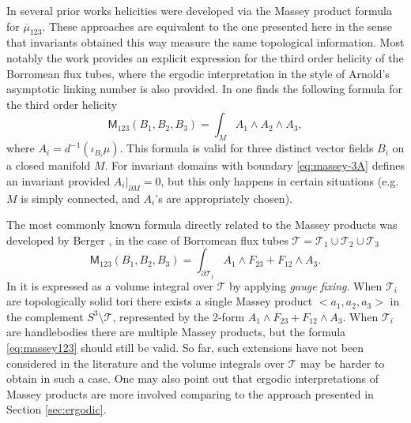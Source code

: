 \documentclass[12pt]{article}
\numberwithin{equation}{section}
\newcommand{\no}{\noindent}
\begin{document}
In several prior works \cite{Berger90, Berger-Evans92, Laurence-Stredulinsky00b, Mayer03} helicities were developed via the Massey product formula for $\bar{\mu}_{123}$. These approaches are equivalent to the one presented here in the sense that invariants obtained this way measure the same topological information. Most notably the work \cite{Laurence-Stredulinsky00b} provides an explicit expression for the third order helicity of the Borromean flux tubes, where the ergodic interpretation in the style of Arnold's asymptotic linking number is also provided.  In  \cite{Mayer03} one finds the following formula for the third order helicity
\begin{equation}\label{eq:massey-3A}
 \mathsf{M}_{123}(B_1,B_2,B_3)=\int_M A_1\wedge A_2\wedge A_3,
\end{equation}
where $A_i=d^{-1}(\iota_{B_i}\mu)$. This formula is valid for three distinct vector fields $B_i$
on a closed manifold $M$. For invariant domains with boundary 
\eqref{eq:massey-3A} defines an invariant provided $A_i\bigl|_{\partial M}=0$, but this only happens in certain situations (e.g. $M$ is simply connected, and $A_i$'s are appropriately chosen). 

\no The most commonly known formula directly related to the Massey products was developed by Berger \cite{Berger90}, in the case of 
Borromean flux tubes $\mathcal{T}=\mathcal{T}_1\cup \mathcal{T}_2\cup \mathcal{T}_3$
\begin{equation}\label{eq:massey123}
 \mathsf{M}_{123}(B_1,B_2,B_3)=\int_{\partial \mathcal{T}_1} A_1\wedge F_{23}+F_{12}\wedge A_3.
\end{equation}
In \cite{Berger90} it is expressed as a volume integral over $\mathcal{T}$ by applying \emph{gauge fixing}. When $\mathcal{T}_i$ are topologically solid tori there exists a single Massey product $<a_1,a_2,a_3>$ in the complement $S^3\setminus \mathcal{T}$, represented by the 2-form $A_1\wedge F_{23}+F_{12}\wedge A_3$. When $\mathcal{T}_i$ are handlebodies there are multiple Massey products, but the formula 
\eqref{eq:massey123} should still be valid. So far, such extensions have not been considered in the literature and the volume integrals over $\mathcal{T}$ may be harder to obtain in such a case.
One may also point out that ergodic interpretations 
of Massey products are more involved \cite{Laurence-Stredulinsky00b} comparing to the approach presented in Section \ref{sec:ergodic}. 


\end{document}
